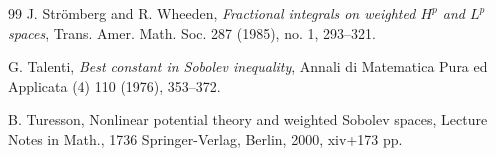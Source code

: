 \documentclass[11pt, a4paper, reqno]{amsart}
\newcommand{\Lup}{\textup{L}}
\theoremstyle{definition}
\theoremstyle{remark}
\begin{document}
\begin{thebibliography}{99}
 J. Str\"omberg and R. Wheeden, \emph{Fractional integrals on weighted $H^{p}$ and $L^{p}$ spaces}, Trans. Amer. Math. Soc. 287 (1985), no. 1, 293--321.


 G. Talenti, \emph{Best constant in Sobolev inequality}, Annali di Matematica Pura ed Applicata (4) 110 (1976), 353--372.

 B. Turesson, {Nonlinear potential theory and weighted Sobolev spaces,} Lecture Notes in Math., 1736
Springer-Verlag, Berlin, 2000, xiv+173 pp.



\end{thebibliography}





\end{document}
